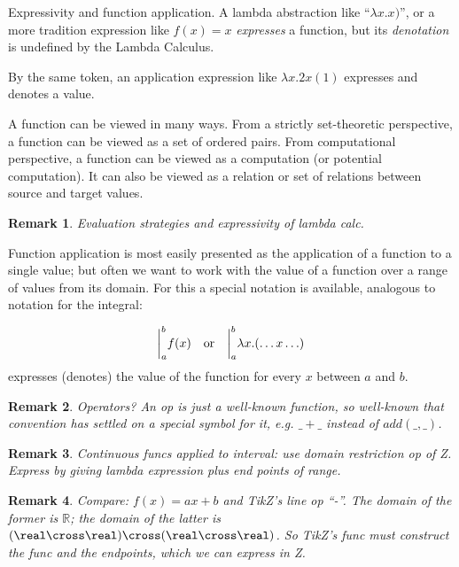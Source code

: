 \documentclass[12pt]{tufte-handout}
\numberwithin{equation}{subsection}
\numberwithin{equation}{subsection}
\newtheorem{remark}{Remark}
\newcommand\R{\(\mathds{R}\)}
\begin{document}
  Expressivity and function application.  A lambda abstraction like
  ``\(\lambda x.x)\)'', or a more tradition expression like \(f(x) = x\)
  \textit{expresses} a function, but its \textit{denotation} is
  undefined by the Lambda Calculus.

  By the same token, an application expression like \(\lambda x.2x(1)\)
  expresses and denotes a value.

  A function can be viewed in many ways.  From a strictly set-theoretic
  perspective, a function can be viewed as a set of ordered pairs.  From
  computational perspective, a function can be viewed as a computation
  (or potential computation).  It can also be viewed as a relation or
  set of relations between source and target values.

  \begin{remark}
    Evaluation strategies and expressivity of lambda calc.
  \end{remark}

  Function application is most easily presented as the application of a
  function to a single value; but often we want to work with the value
  of a function over a range of values from its domain.  For this a
  special notation is available, analogous to notation for the integral:

  \[\bigg|_a^b f(x) \quad\textnormal{or}\quad\bigg|_a^b \lambda x.(\ldots x\ldots)\]
  \noindent expresses (denotes) the value of the function for every \(x\) between \(a\) and \(b\).

  \begin{remark}
    Operators?  An op is just a well-known function, so well-known that
    convention has settled on a special symbol for it, e.g. \(\_+\_\)
    instead of \(add(\_,\_)\).
  \end{remark}

  \begin{remark}
    Continuous funcs applied to interval: use domain restriction op of
    Z.  Express by giving lambda expression plus end points of range.
  \end{remark}

  \begin{remark}
    Compare: \(f(x) = ax + b\) and TikZ's line op ``-\-''.  The domain
    of the former is \R{}; the domain of the latter is
    \((\real\cross\real)\cross(\real\cross\real)\).  So TikZ's func must
    construct the func and the endpoints, which we can express in Z.
  \end{remark}
\end{document}
